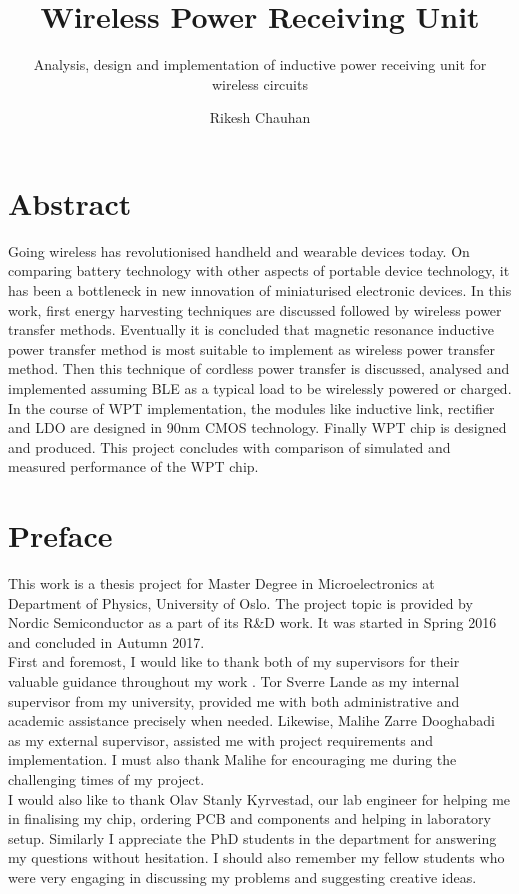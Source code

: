 \documentclass[UKenglish]{ifimaster}  %
\title{Wireless Power Receiving Unit}
\subtitle{Analysis, design and implementation of inductive power receiving unit for wireless circuits}
\author{Rikesh Chauhan}
\begin{document}
\ififorside{}
\frontmatter{}
\maketitle{}


\chapter*{Abstract}
Going wireless has revolutionised handheld and wearable devices today. On comparing battery technology with other aspects of portable device technology, it has 
been a bottleneck in new innovation of miniaturised electronic devices.  In this work, first energy harvesting techniques are discussed followed by wireless power 
transfer methods. Eventually it is concluded that magnetic resonance inductive power transfer method is most suitable to implement as wireless power transfer 
method. Then this technique of cordless  power transfer is discussed, analysed and implemented assuming BLE as a typical load to be wirelessly powered or 
charged.  In the course of WPT implementation, the modules like inductive link, rectifier and LDO are designed in 90nm CMOS technology. Finally WPT chip 
is designed and produced. This project concludes with comparison of simulated and measured performance of the WPT chip.

\chapter*{Preface}
This work is a thesis project for Master Degree in Microelectronics at Department of Physics, University of Oslo. The project topic is provided by Nordic Semiconductor 
as a part of its R\&D work. It was started in Spring 2016 and concluded in Autumn 2017. \\

First and foremost, I would like to thank both of my supervisors for their valuable guidance throughout my work . Tor Sverre Lande as my internal supervisor from my university, provided me with both administrative and academic assistance precisely when needed. Likewise, Malihe Zarre Dooghabadi as my external 
supervisor, assisted me with project requirements and implementation. I must also thank Malihe for encouraging me during the challenging times of my project. \\

I would also like to thank Olav Stanly Kyrvestad, our lab engineer for helping me in finalising my chip, ordering PCB and components and helping in laboratory  setup. 
Similarly I appreciate the PhD students in the department for answering my questions without hesitation. I should also remember my fellow students who were very engaging in discussing my problems and suggesting creative ideas. \\
\end{document}
